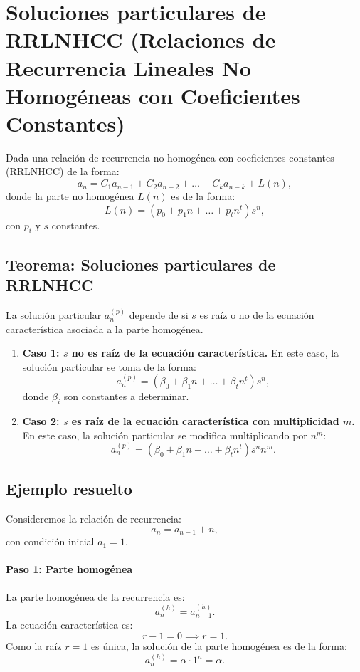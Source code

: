 \documentclass{article}
\begin{document}
\newpage

\section{Soluciones particulares de RRLNHCC (Relaciones de Recurrencia Lineales No Homogéneas con Coeficientes Constantes)}

Dada una relación de recurrencia no homogénea con coeficientes constantes (RRLNHCC) de la forma:
\[
a_n = C_1a_{n-1} + C_2a_{n-2} + \dots + C_k a_{n-k} + L(n),
\]
donde la parte no homogénea $L(n)$ es de la forma:
\[
L(n) = (p_0 + p_1n + \dots + p_t n^t)s^n,
\]
con $p_i$ y $s$ constantes.

\subsection{Teorema: Soluciones particulares de RRLNHCC}
La solución particular $a_n^{(p)}$ depende de si $s$ es raíz o no de la ecuación característica asociada a la parte homogénea.

\begin{enumerate}
    \item \textbf{Caso 1: $s$ no es raíz de la ecuación característica.} En este caso, la solución particular se toma de la forma:
    \[
    a_n^{(p)} = (\beta_0 + \beta_1n + \dots + \beta_t n^t)s^n,
    \]
    donde $\beta_i$ son constantes a determinar.

    \item \textbf{Caso 2: $s$ es raíz de la ecuación característica con multiplicidad $m$.} En este caso, la solución particular se modifica multiplicando por $n^m$:
    \[
    a_n^{(p)} = (\beta_0 + \beta_1n + \dots + \beta_t n^t)s^n n^m.
    \]
\end{enumerate}

\subsection{Ejemplo resuelto}
Consideremos la relación de recurrencia:
\[
a_n = a_{n-1} + n,
\]
con condición inicial $a_1 = 1$.

\paragraph{Paso 1: Parte homogénea}
La parte homogénea de la recurrencia es:
\[
a_n^{(h)} = a_{n-1}^{(h)}.
\]
La ecuación característica es:
\[
r - 1 = 0 \implies r = 1.
\]
Como la raíz $r = 1$ es única, la solución de la parte homogénea es de la forma:
\[
a_n^{(h)} = \alpha \cdot 1^n = \alpha.
\]
\end{document}
